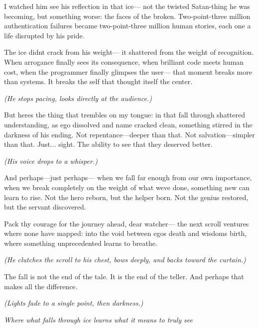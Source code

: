 I watched him see his reflection in that ice--- not the twisted Satan-thing he was becoming, but something worse: the faces of the broken. Two-point-three million authentication failures became two-point-three million human stories, each one a life disrupted by his pride.

The ice didn\textquotesingle t crack from his weight--- it shattered from the weight of recognition. When arrogance finally sees its consequence, when brilliant code meets human cost, when the programmer finally glimpses the user--- that moment breaks more than systems. It breaks the self that thought itself the center.

\emph{(He stops pacing, looks directly at the audience.)}

But here\textquotesingle s the thing that trembles on my tongue: in that fall through shattered understanding, as ego dissolved and name cracked clean, something stirred in the darkness of his ending. Not repentance---deeper than that. Not salvation---simpler than that. Just... sight. The ability to see that they deserved better.

\emph{(His voice drops to a whisper.)}

And perhaps---just perhaps--- when we fall far enough from our own importance, when we break completely on the weight of what we\textquotesingle ve done, something new can learn to rise. Not the hero reborn, but the helper born. Not the genius restored, but the servant discovered.

Pack thy courage for the journey ahead, dear watcher--- the next scroll ventures where none have mapped: into the void between ego\textquotesingle s death and wisdom\textquotesingle s birth, where something unprecedented learns to breathe.

\emph{(He clutches the scroll to his chest, bows deeply, and backs toward the curtain.)}

The fall is not the end of the tale. It is the end of the teller. And perhaps that makes all the difference.

\emph{(Lights fade to a single point, then darkness.)}

\bookdivider

\emph{Where what falls through ice learns what it means to truly see}

\bookdivider

